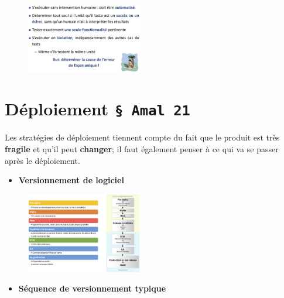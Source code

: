 \documentclass[16pt]{report}
\begin{document}
\begin{multicols*}{2}
    \begin{figure}[H]
        \begin{center}
            \includegraphics[width=0.45\textwidth]{qtypique2.png}
        \end{center}
    \end{figure}


    \chapter{Déploiement \texttt{\S \; Amal 21}  }
    \begin{note}{}{}
        Les stratégies de déploiement tiennent compte du fait que le produit 
        est très \textbf{fragile} et qu'il peut \textbf{changer}; il faut également 
        penser à ce qui va se passer \textcolor{myb}{après le déploiement}.   
    \end{note}

    \begin{itemize}
        \item \textbf{Versionnement de logiciel}  
    \end{itemize}
    \begin{figure}[H]
        \begin{center}
            \includegraphics[width=0.45\textwidth]{versionnementlogi.png}
        \end{center}
    \end{figure}


    \begin{itemize}
        \item \textbf{Séquence de versionnement typique}  
    \end{itemize}



\end{multicols*}
\end{document}
